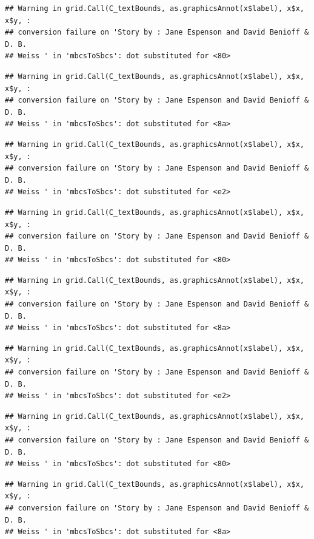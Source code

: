 \documentclass[]{article}
\begin{document}
\begin{verbatim}
## Warning in grid.Call(C_textBounds, as.graphicsAnnot(x$label), x$x, x$y, :
## conversion failure on 'Story by : Jane Espenson and David Benioff & D. B.
## Weiss ' in 'mbcsToSbcs': dot substituted for <80>
\end{verbatim}

\begin{verbatim}
## Warning in grid.Call(C_textBounds, as.graphicsAnnot(x$label), x$x, x$y, :
## conversion failure on 'Story by : Jane Espenson and David Benioff & D. B.
## Weiss ' in 'mbcsToSbcs': dot substituted for <8a>
\end{verbatim}

\begin{verbatim}
## Warning in grid.Call(C_textBounds, as.graphicsAnnot(x$label), x$x, x$y, :
## conversion failure on 'Story by : Jane Espenson and David Benioff & D. B.
## Weiss ' in 'mbcsToSbcs': dot substituted for <e2>
\end{verbatim}

\begin{verbatim}
## Warning in grid.Call(C_textBounds, as.graphicsAnnot(x$label), x$x, x$y, :
## conversion failure on 'Story by : Jane Espenson and David Benioff & D. B.
## Weiss ' in 'mbcsToSbcs': dot substituted for <80>
\end{verbatim}

\begin{verbatim}
## Warning in grid.Call(C_textBounds, as.graphicsAnnot(x$label), x$x, x$y, :
## conversion failure on 'Story by : Jane Espenson and David Benioff & D. B.
## Weiss ' in 'mbcsToSbcs': dot substituted for <8a>
\end{verbatim}

\begin{verbatim}
## Warning in grid.Call(C_textBounds, as.graphicsAnnot(x$label), x$x, x$y, :
## conversion failure on 'Story by : Jane Espenson and David Benioff & D. B.
## Weiss ' in 'mbcsToSbcs': dot substituted for <e2>
\end{verbatim}

\begin{verbatim}
## Warning in grid.Call(C_textBounds, as.graphicsAnnot(x$label), x$x, x$y, :
## conversion failure on 'Story by : Jane Espenson and David Benioff & D. B.
## Weiss ' in 'mbcsToSbcs': dot substituted for <80>
\end{verbatim}

\begin{verbatim}
## Warning in grid.Call(C_textBounds, as.graphicsAnnot(x$label), x$x, x$y, :
## conversion failure on 'Story by : Jane Espenson and David Benioff & D. B.
## Weiss ' in 'mbcsToSbcs': dot substituted for <8a>
\end{verbatim}
\end{document}
